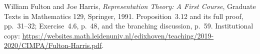 William Fulton and Joe Harris,
\emph{Representation Theory: A First Course},
Graduate Texts in Mathematics 129, Springer, 1991.
Proposition~3.12 and its full proof, pp.~31--32;
Exercise~4.6, p.~48, and the branching discussion, p.~59.
Institutional copy:
\url{https://websites.math.leidenuniv.nl/edixhoven/teaching/2019-2020/CIMPA/Fulton-Harris.pdf}.

